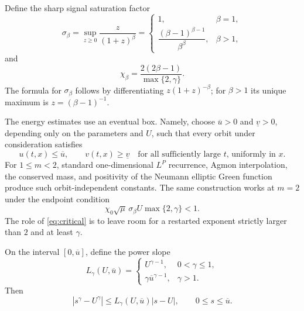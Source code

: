 \documentclass[11pt]{article}
\newcommand{\abs}[1]{\left\lvert #1\right\rvert}
\begin{document}
Define the sharp signal saturation factor
\begin{equation}
 \sigma_\beta=
 \sup_{z\ge0}\frac{z}{(1+z)^\beta}
 =
 \begin{cases}
 1,&\beta=1,\\[1mm]
 \dfrac{(\beta-1)^{\beta-1}}{\beta^\beta},&\beta>1,
 \end{cases}                                           \label{eq:sigmabeta}
\end{equation}
and
\begin{equation}
 \chi_\beta=\frac{2(2\beta-1)}{\max\{2,\gamma\}}.       \label{eq:chibeta}
\end{equation}
The formula for \(\sigma_\beta\) follows by differentiating
\(z(1+z)^{-\beta}\); for \(\beta>1\) its unique maximum is
\(z=(\beta-1)^{-1}\).

The energy estimates use an eventual box.  Namely, choose
\(\overline u>0\) and \(\underline v>0\), depending only on the parameters
and \(U\), such that every orbit under consideration satisfies
\begin{equation}
 u(t,x)\le\overline u,\qquad v(t,x)\ge\underline v
 \quad\text{for all sufficiently large \(t\), uniformly in \(x\)}.
                                                               \label{eq:box}
\end{equation}
For \(1\le m<2\), standard one-dimensional \(L^P\) recurrence, Agmon
interpolation, the conserved mass, and positivity of the Neumann elliptic
Green function produce such orbit-independent constants.  The same
construction works at \(m=2\) under the endpoint condition
\begin{equation}
 \chi_0\sqrt\mu\,\sigma_\beta U\max\{2,\gamma\}<1.      \label{eq:critical}
\end{equation}
The role of \eqref{eq:critical} is to leave room for a restarted exponent
strictly larger than \(2\) and at least \(\gamma\).

On the interval \([0,\overline u]\), define the power slope
\begin{equation}
 L_\gamma(U,\overline u)=
 \begin{cases}
 U^{\gamma-1},&0<\gamma\le1,\\[1mm]
 \gamma\overline u^{\gamma-1},&\gamma>1.
 \end{cases}                                           \label{eq:slope}
\end{equation}
Then
\[
 \abs{s^\gamma-U^\gamma}
 \le L_\gamma(U,\overline u)\abs{s-U},
 \qquad 0\le s\le\overline u.
\]
\end{document}
